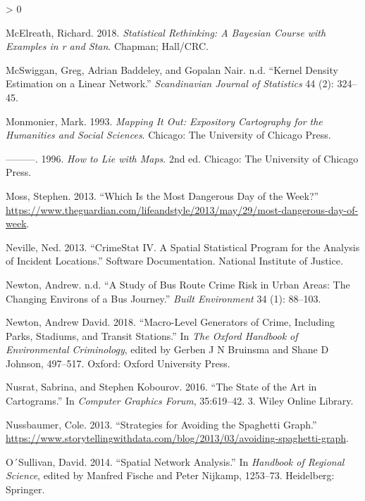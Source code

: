 \documentclass[
  krantz2]{krantz}
\newlength{\cslhangindent}
\newenvironment{CSLReferences}[2] %
 {%
  \setlength{\parindent}{0pt}
  \ifodd #1 \everypar{\setlength{\hangindent}{\cslhangindent}}\ignorespaces\fi
  \ifnum #2 > 0
  \setlength{\parskip}{#2\baselineskip}
  \fi
 }%
 {}
\begin{document}
\begin{CSLReferences}{1}{0}
\leavevmode\hypertarget{ref-McElreath_2018}{}%
McElreath, Richard. 2018. \emph{Statistical Rethinking: A Bayesian Course with Examples in r and Stan}. Chapman; Hall/CRC.

\leavevmode\hypertarget{ref-McSwiggan_2016}{}%
McSwiggan, Greg, Adrian Baddeley, and Gopalan Nair. n.d. {``Kernel Density Estimation on a Linear Network.''} \emph{Scandinavian Journal of Statistics} 44 (2): 324--45.

\leavevmode\hypertarget{ref-Monmonier_1993}{}%
Monmonier, Mark. 1993. \emph{Mapping It Out: Expository Cartography for the Humanities and Social Sciences}. Chicago: The University of Chicago Press.

\leavevmode\hypertarget{ref-Monmonier_1996}{}%
---------. 1996. \emph{How to Lie with Maps}. 2nd ed. Chicago: The University of Chicago Press.

\leavevmode\hypertarget{ref-Moss_2013}{}%
Moss, Stephen. 2013. {``Which Is the Most Dangerous Day of the Week?''} \url{https://www.theguardian.com/lifeandstyle/2013/may/29/most-dangerous-day-of-week}.

\leavevmode\hypertarget{ref-Neville_2013}{}%
Neville, Ned. 2013. {``CrimeStat IV. A Spatial Statistical Program for the Analysis of Incident Locations.''} Software Documentation. National Institute of Justice.

\leavevmode\hypertarget{ref-Newton_2008}{}%
Newton, Andrew. n.d. {``A Study of Bus Route Crime Risk in Urban Areas: The Changing Environs of a Bus Journey.''} \emph{Built Environment} 34 (1): 88--103.

\leavevmode\hypertarget{ref-Newton_2018}{}%
Newton, Andrew David. 2018. {``Macro-Level Generators of Crime, Including Parks, Stadiums, and Transit Stations.''} In \emph{The Oxford Handbook of Environmental Criminology}, edited by Gerben J N Bruinsma and Shane D Johnson, 497--517. Oxford: Oxford University Press.

\leavevmode\hypertarget{ref-Nusrat_2016}{}%
Nusrat, Sabrina, and Stephen Kobourov. 2016. {``The State of the Art in Cartograms.''} In \emph{Computer Graphics Forum}, 35:619--42. 3. Wiley Online Library.

\leavevmode\hypertarget{ref-Nussbaumer_2013}{}%
Nussbaumer, Cole. 2013. {``Strategies for Avoiding the Spaghetti Graph.''} \url{https://www.storytellingwithdata.com/blog/2013/03/avoiding-spaghetti-graph}.

\leavevmode\hypertarget{ref-OSullivan_2014}{}%
O´Sullivan, David. 2014. {``Spatial Network Analysis.''} In \emph{Handbook of Regional Science}, edited by Manfred Fische and Peter Nijkamp, 1253--73. Heidelberg: Springer.


\end{CSLReferences}
\end{document}
